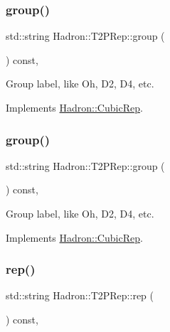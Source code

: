 \subsubsection{\texorpdfstring{group()}{group()}\hspace{0.1cm}{\footnotesize\ttfamily [2/3]}}
{\footnotesize\ttfamily std\+::string Hadron\+::\+T2\+P\+Rep\+::group (\begin{DoxyParamCaption}{ }\end{DoxyParamCaption}) const\hspace{0.3cm}{\ttfamily [inline]}, {\ttfamily [virtual]}}

Group label, like Oh, D2, D4, etc. 

Implements \mbox{\hyperlink{structHadron_1_1CubicRep_a0748f11ec87f387062c8e8981339a29c}{Hadron\+::\+Cubic\+Rep}}.

\mbox{\label{structHadron_1_1T2PRep_af477032faaa8fb25f13f9e962dd68437}} 
\subsubsection{\texorpdfstring{group()}{group()}\hspace{0.1cm}{\footnotesize\ttfamily [3/3]}}
{\footnotesize\ttfamily std\+::string Hadron\+::\+T2\+P\+Rep\+::group (\begin{DoxyParamCaption}{ }\end{DoxyParamCaption}) const\hspace{0.3cm}{\ttfamily [inline]}, {\ttfamily [virtual]}}

Group label, like Oh, D2, D4, etc. 

Implements \mbox{\hyperlink{structHadron_1_1CubicRep_a0748f11ec87f387062c8e8981339a29c}{Hadron\+::\+Cubic\+Rep}}.

\mbox{\label{structHadron_1_1T2PRep_a34a7ab2061f6a666c64ba2b44e0f203d}} 
\subsubsection{\texorpdfstring{rep()}{rep()}\hspace{0.1cm}{\footnotesize\ttfamily [1/3]}}
{\footnotesize\ttfamily std\+::string Hadron\+::\+T2\+P\+Rep\+::rep (\begin{DoxyParamCaption}{ }\end{DoxyParamCaption}) const\hspace{0.3cm}{\ttfamily [inline]}, {\ttfamily [virtual]}}

